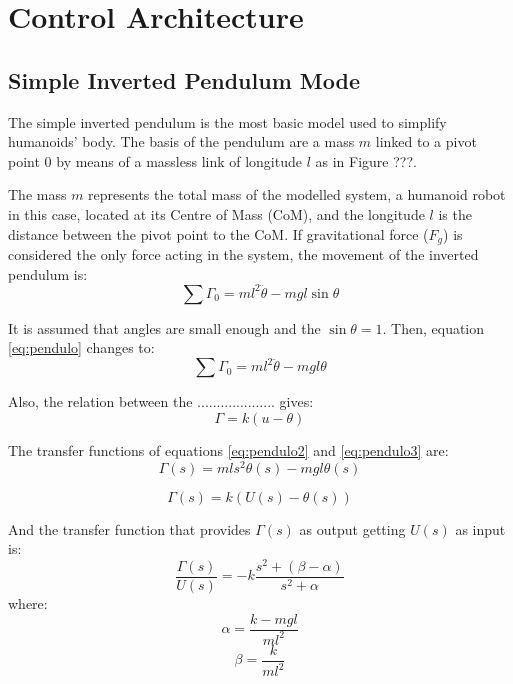 \chapter{Control Architecture}
\section{Simple Inverted Pendulum Mode}
The simple inverted pendulum is the most basic model used to simplify humanoids' body. The basis of the pendulum are a mass $m$ linked to a pivot point $0$ by means of a massless link of longitude $l$ as in Figure ???.

The mass $m$ represents the total mass of the modelled system, a humanoid robot in this case, located at its Centre of Mass (CoM), and the longitude $l$ is the distance between the pivot point to the CoM. If gravitational force ($F_g$) is considered the only force acting in the system, the movement of the inverted pendulum is:
\begin{equation}
\sum{\Gamma_0} = ml^2 \ddot{\theta} - mgl\sin\theta
\label{eq:pendulo}
\end{equation}

It is assumed that angles are small enough and the $\sin\theta = 1$. Then, equation \ref{eq:pendulo} changes to:
\begin{equation}
\sum{\Gamma_0} = ml^2 \ddot{\theta} - mgl\theta
\label{eq:pendulo2}
\end{equation}

Also, the relation between the .................... gives:
\begin{equation}
\Gamma = k(u-\theta)
\label{eq:pendulo3}
\end{equation}

The transfer functions of equations \ref{eq:pendulo2} and \ref{eq:pendulo3} are:
\begin{equation}
\Gamma(s) = mls^2\theta(s) - mgl\theta(s)
\end{equation}

\begin{equation}
\Gamma(s) = k(U(s)-\theta(s))
\end{equation}

And the transfer function that provides $\Gamma(s)$ as output getting $U(s)$ as input is:
\begin{equation}
\frac{\Gamma(s)}{U(s)} = -k \frac{s^2+(\beta - \alpha)}{s^2 + \alpha}
\label{eq:TFpar}
\end{equation}
where:
\begin{equation}
\alpha = \frac{k-mgl}{ml^2}
\end{equation}
\begin{equation}
\beta = \frac{k}{ml^2}
\end{equation}

